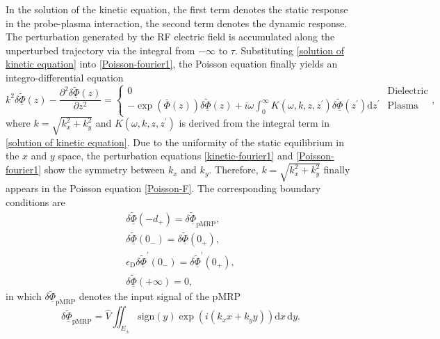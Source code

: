 \documentclass[superscriptaddress,preprint]{revtex4}  %
\begin{document}
In the solution of the kinetic equation, the first term denotes the static response in the probe-plasma interaction, the second term denotes the dynamic response. The perturbation generated by the RF electric field is accumulated along the unperturbed trajectory via the integral from $-\infty$ to $\tau$.
Substituting \eqref{solution of kinetic equation} into \eqref{Poisson-fourier1}, the Poisson equation finally yields an integro-differential equation
\begin{equation}
k^2 \delta\underline{\tilde{\Phi}}(z) -\frac{\partial^2 \delta\underline{\tilde{\Phi}}(z) }{\partial z^2}=
\begin{cases}
0      &\text{Dielectric} \\
\displaystyle{-\exp\left(\bar \Phi (z) \right) \delta\underline{\tilde{\Phi}}(z) + i\omega \int_0^\infty K\left(\omega,k,z,z^\prime\right) \delta\underline{\tilde{\Phi}}\left(z^\prime\right) \mathrm{d}z^\prime} &\text{Plasma}  
\end{cases},
\label{Poisson-F}
\end{equation}
where $k=\sqrt{k_x^2+k_y^2}$ and $K\left(\omega,k,z,z^\prime\right)$ is derived from the integral term in \eqref{solution of kinetic equation}. Due to the uniformity of the static equilibrium in the $x$ and $y$ space, the perturbation equations \eqref{kinetic-fourier1} and \eqref{Poisson-fourier1} show the symmetry between $k_x$ and $k_y$. Therefore, $k=\sqrt{k_x^2+k_y^2}$ finally appears in the Poisson equation \eqref{Poisson-F}. The corresponding boundary conditions are
\begin{gather}
\delta\underline{\tilde{\Phi}}(-d_+) =\delta\underline{\tilde{\Phi}}_\mathrm{p\!M\!R\!P},\\
\delta\underline{\tilde{\Phi}}(0_-) =\delta\underline{\tilde{\Phi}}(0_+),\\
\epsilon_\mathrm{D} \delta\underline{\tilde{\Phi}}^{\prime}(0_-) =\delta\underline{\tilde{\Phi}}^{\prime}(0_+),\\
\delta\underline{\tilde{\Phi}}(+\infty) =0 ,
\end{gather}
in which $\delta\underline{\tilde{\Phi}}_\mathrm{p\!M\!R\!P}$ denotes the input signal of the pMRP
\begin{equation}
\delta\underline{\tilde{\Phi}}_\mathrm{p\!M\!R\!P}=\hat{V} \iint_{E_\pm}  \mathrm{sign} (y) \exp\left(i (k_x x+k_y y)\right)\mathrm{d}x \, \mathrm{d}y .
\end{equation}
\end{document}
